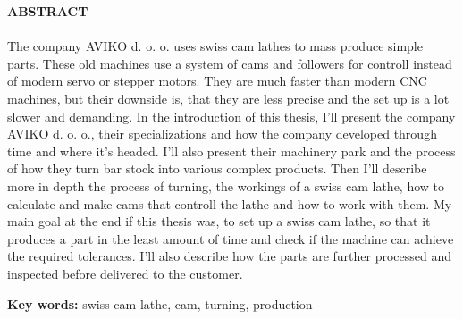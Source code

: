 \newpage
\textbf{\fontsize{14}{21}\selectfont ABSTRACT} \\
\\
The company AVIKO d. o. o. uses swiss cam lathes to mass produce
simple parts. These old machines use a system of cams and followers
for controll instead of modern servo or stepper motors. They are
much faster than modern CNC machines, but their downside is,
that they are less precise and the set up is a lot slower and demanding.
In the introduction of this thesis, I'll present the company
AVIKO d. o. o., their specializations and how the company developed
through time and where it's headed. I'll also present their
machinery park and the process of how they turn bar stock into
various complex products. Then I'll describe more in depth the
process of turning, the workings of a swiss cam lathe, how to
calculate and make cams that controll the lathe and how to work
with them. My main goal at the end if this thesis was, to set up
a swiss cam lathe, so that it produces a part in the least amount
of time and check if the machine can achieve the required
tolerances. I'll also describe how the parts are further processed
and inspected before delivered to the customer.

\textbf{\fontsize{14}{21}\selectfont Key words:}
\fontsize{12}{16}swiss cam lathe, cam, turning, production